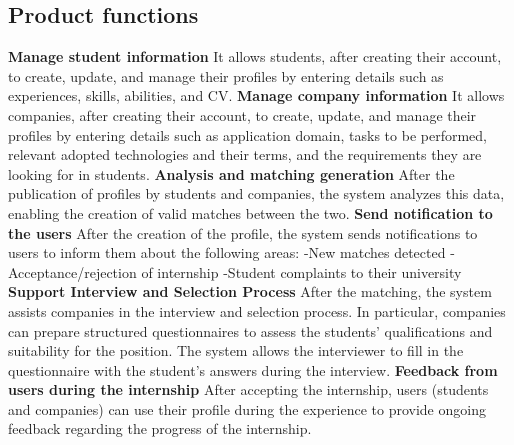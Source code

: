 \documentclass{article}
\begin{document}
\subsection{Product functions}
\textbf{Manage student information}\newline
It allows students, after creating their account, to create, update, and manage their profiles by entering details such as experiences, skills, abilities, and CV.\newline
\newline
\textbf{Manage company information}\newline
It allows companies, after creating their account, to create, update, and manage their profiles by entering details such as application domain, tasks to be performed, relevant adopted technologies and their terms, and the requirements they are looking for in students.\newline
\newline
\textbf{Analysis and matching generation}\newline
After the publication of profiles by students and companies, the system analyzes this data, enabling the creation of valid matches between the two.\newline
\newline
\textbf{Send notification to the users}\newline
After the creation of the profile, the system sends notifications to users to inform them about the following areas:
-New matches detected
-Acceptance/rejection of internship
-Student complaints to their university
\newline
\newline
\textbf{Support Interview and Selection Process}\newline
After the matching, the system assists companies in the interview and selection process. In particular, companies can prepare structured questionnaires to assess the students' qualifications and suitability for the position. The system allows the interviewer to fill in the questionnaire with the student's answers during the interview.\newline
\newline
\textbf{Feedback from users during the internship}\newline
After accepting the internship, users (students and companies) can use their profile during the experience to provide ongoing feedback regarding the progress of the internship. \newline
\newline
\end{document}
